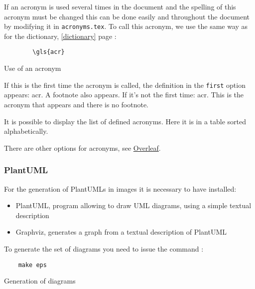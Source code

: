 If an acronym is used several times in the document and the spelling of this acronym must be changed
this can be done easily and throughout the document by modifying it in \verb=acronyms.tex=.
To call this acronym, we use the same way as for the dictionary, \ref{dictionary} page \pageref{dictionary} :
\begin{code}
    \begin{verbatim}
        \gls{acr}
\end{verbatim}
    \caption{Use of an acronym}
\end{code}

If this is the first time the acronym is called, the definition in the \verb=first= option appears: \gls{acr}.
A footnote also appears. \newline
If it's not the first time: \gls{acr}. This is the acronym that appears and there is no footnote. \newline

It is possible to display the list of defined acronyms. Here it is in a table sorted alphabetically.

\printglossary[type=\acronymtype,style=superheaderborder ,title={Definitions, acronyms and abbreviations}]
\glsaddallunused \newline %

There are other options for acronyms, see \href{https://fr.overleaf.com/learn/latex/Glossaries}{Overleaf}.

\subsubsection{PlantUML}
For the generation of PlantUMLs in images it is necessary to have installed:
\begin{itemize}
    \item PlantUML, program allowing to draw UML diagrams, using a simple textual description
    \item Graphviz, generates a graph from a textual description of PlantUML
\end{itemize}

To generate the set of diagrams you need to issue the command :
\begin{code}
    \begin{verbatim}
    make eps
\end{verbatim}
    \caption{Generation of diagrams}
\end{code}

